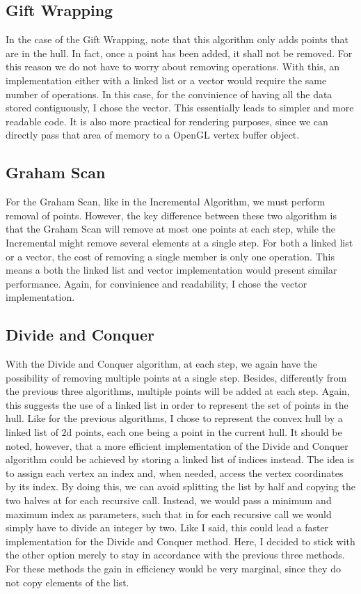 \documentclass[a4paper, 10pt, conference]{ieeeconf}      %
\begin{document}
\subsection{Gift Wrapping}
In the case of the Gift Wrapping, note that this algorithm only adds points that are in the hull.
In fact, once a point has been added, it shall not be removed.
For this reason we do not have to worry about removing operations.
With this, an implementation either with a linked list or a vector would require the same number of operations. 
In this case, for the convinience of having all the data stored contiguously, I chose the vector.
This essentially leads to simpler and more readable code.
It is also more practical for rendering purposes, since we can directly pass that area of memory to a OpenGL vertex buffer object.

\subsection{Graham Scan}
For the Graham Scan, like in the Incremental Algorithm, we must perform removal of points.
However, the key difference between these two algorithm is that the Graham Scan will remove at most one points at each step, while the Incremental might remove several elements at a single step.
For both a linked list or a vector, the cost of removing a single member is only one operation.
This means a both the linked list and vector implementation would present similar performance.
Again, for convinience and readability, I chose the vector implementation.

\subsection{Divide and Conquer}
With the Divide and Conquer algorithm, at each step, we again have the possibility of removing multiple points at a single step.
Besides, differently from the previous three algorithms, multiple points will be added at each step.
Again, this suggests the use of a linked list in order to represent the set of points in the hull.
Like for the previous algorithms, I chose to represent the convex hull by a linked list of $2$d points, each one being a point in the current hull.
It should be noted, however, that a more efficient implementation of the Divide and Conquer algorithm could be achieved by storing a linked list of indices instead.
The idea is to assign each vertex an index and, when needed, access the vertex coordinates by its index.
By doing this, we can avoid splitting the list by half and copying the two halves at for each recursive call.
Instead, we would pass a minimum and maximum index as parameters, such that in for each recursive call we would simply have to divide an integer by two.
Like I said, this could lead a faster implementation for the Divide and Conquer method.
Here, I decided to stick with the other option merely to stay in accordance with the previous three methods.
For these methods the gain in efficiency would be very marginal, since they do not copy elements of the list.
\end{document}
